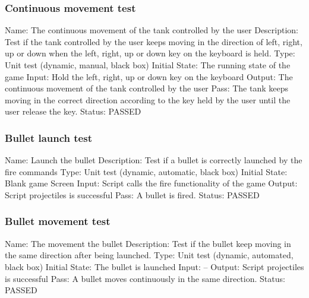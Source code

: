 \documentclass{article}
\begin{document}
\subsubsection{Continuous movement test}
\label{sec:3.1.16}
Name:  The continuous movement of the tank controlled by the user\newline
Description: Test if the tank controlled by the user keeps moving in the 
direction of left, right, up or down when the left, right, up or down key on 
the keyboard is held. \newline
Type: Unit test (dynamic, manual, black box) \newline
Initial State:  The running state of the game \newline
Input: Hold the left, right, up or down key on the keyboard\newline
Output: The continuous movement of the tank controlled by the user\newline
Pass:  The tank keeps moving in the correct direction according to the key 
held by the user until the user release the key. \newline
\newline Status: PASSED

\subsubsection{Bullet launch test}
\label{sec:3.1.17}
Name:  Launch the bullet\newline
Description: Test if a bullet is correctly launched by the fire commands \newline
Type: Unit test (dynamic, automatic, black box) \newline
Initial State: Blank game Screen\newline
Input: Script calls the fire functionality of the game\newline
Output: Script projectiles is successful  \newline
Pass: A bullet is fired.\newline
\newline Status: PASSED

\subsubsection{Bullet movement test}
\label{sec:3.1.18}
Name:  The movement the bullet\newline
Description: Test if the bullet keep moving in the same direction after being 
launched. \newline
Type: Unit test (dynamic, automated, black box) \newline
Initial State:  The bullet is launched \newline
Input: --\newline
Output: Script projectiles is successful  \newline
Pass: A bullet moves continuously in the same direction.\newline
\newline Status: PASSED
\end{document}
